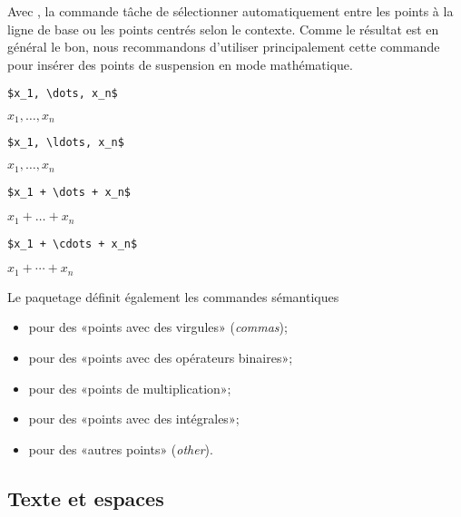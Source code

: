 Avec , la commande \cmd{\dots} tâche de sélectionner
automatiquement entre les points à la ligne de base ou les points
centrés selon le contexte. Comme le résultat est en général le bon,
nous recommandons d'utiliser principalement cette commande pour
insérer des points de suspension en mode mathématique.
\begin{demo}
  \begin{texample}
\begin{lstlisting}
$x_1, \dots, x_n$
\end{lstlisting}
    \producing $x_1, \dots, x_n$
  \end{texample}

  \begin{texample}
\begin{lstlisting}
$x_1, \ldots, x_n$
\end{lstlisting}
    \producing $x_1, \ldots, x_n$
  \end{texample}

  \begin{texample}
\begin{lstlisting}
$x_1 + \dots + x_n$
\end{lstlisting}
    \producing $x_1 + \dots + x_n$
  \end{texample}

  \begin{texample}
\begin{lstlisting}
$x_1 + \cdots + x_n$
\end{lstlisting}
    \producing $x_1 + \cdots + x_n$
  \end{texample}
\end{demo}
Le paquetage définit également les commandes sémantiques
\begin{itemize}
\item \cmd{\dotsc} pour des «points avec des virgules» (\emph{commas});
\item \cmd{\dotsb} pour des «points avec des opérateurs binaires»;
\item \cmd{\dotsm} pour des «points de multiplication»;
\item \cmd{\dotsi} pour des «points avec des intégrales»;
\item \cmd{\dotso} pour des «autres points» (\emph{other}).
\end{itemize}

\subsection{Texte et espaces}
\label{sec:math:bases:texte}

